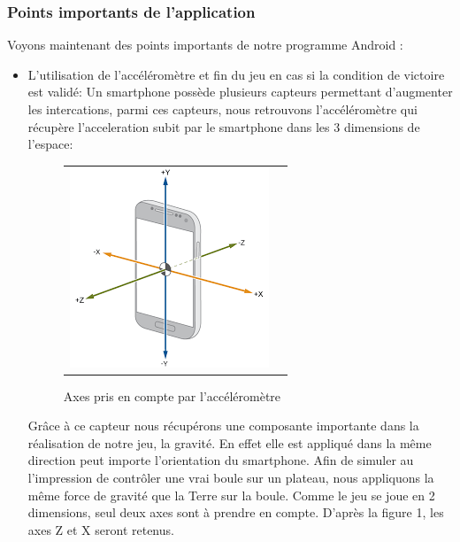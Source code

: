 \documentclass{article}
\begin{document}
\subsubsection{Points importants de l'application}
Voyons maintenant des points importants de notre programme Android :
\begin{itemize}
\item L'utilisation de l'accéléromètre et fin du jeu en cas si la condition de victoire est validé:
Un smartphone possède plusieurs capteurs permettant d'augmenter les intercations, parmi ces capteurs, nous retrouvons l'accéléromètre qui récupère l'acceleration subit par le smartphone dans les 3 dimensions de l'espace:
    \begin{figure}[h!]
        \begin{center}
        \begin{tabular}{|l|l|}
        \includegraphics[scale=0.6]{schemaAccelerometre.png} %
        \end{tabular}
        \end{center}
        \caption{Axes pris en compte par l'accéléromètre}
        \label{tab:Schema electrique}
    \end{figure}
    Grâce à ce capteur nous récupérons une composante importante dans la réalisation de notre jeu, la gravité. En effet elle est appliqué dans la même direction peut importe l'orientation du smartphone. Afin de simuler au l'impression de contrôler une vrai boule sur un plateau, nous appliquons la même force de gravité que la Terre sur la boule. Comme le jeu se joue en 2 dimensions, seul deux axes sont à prendre en compte. D'après la figure 1, les axes Z et X seront retenus.
    

\end{itemize}
\end{document}
